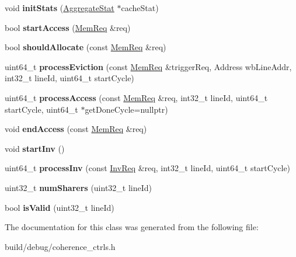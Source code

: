 \begin{DoxyCompactItemize}
\item 
\hypertarget{classMESICC_a7424c192e0d55b477e036da015e47697}{void {\bfseries init\-Stats} (\hyperlink{classAggregateStat}{Aggregate\-Stat} $\ast$cache\-Stat)}\label{classMESICC_a7424c192e0d55b477e036da015e47697}

\item 
\hypertarget{classMESICC_adb266df86e3a6455a7384bc8d3958dfc}{bool {\bfseries start\-Access} (\hyperlink{structMemReq}{Mem\-Req} \&req)}\label{classMESICC_adb266df86e3a6455a7384bc8d3958dfc}

\item 
\hypertarget{classMESICC_adff3fdd77b8eb96e12c854ce3c5496ae}{bool {\bfseries should\-Allocate} (const \hyperlink{structMemReq}{Mem\-Req} \&req)}\label{classMESICC_adff3fdd77b8eb96e12c854ce3c5496ae}

\item 
\hypertarget{classMESICC_a0489e87c75a299d40c1b06b3660b015f}{uint64\-\_\-t {\bfseries process\-Eviction} (const \hyperlink{structMemReq}{Mem\-Req} \&trigger\-Req, Address wb\-Line\-Addr, int32\-\_\-t line\-Id, uint64\-\_\-t start\-Cycle)}\label{classMESICC_a0489e87c75a299d40c1b06b3660b015f}

\item 
\hypertarget{classMESICC_aa8e01a308fd975cb06ed958fe79b5f5c}{uint64\-\_\-t {\bfseries process\-Access} (const \hyperlink{structMemReq}{Mem\-Req} \&req, int32\-\_\-t line\-Id, uint64\-\_\-t start\-Cycle, uint64\-\_\-t $\ast$get\-Done\-Cycle=nullptr)}\label{classMESICC_aa8e01a308fd975cb06ed958fe79b5f5c}

\item 
\hypertarget{classMESICC_a191b816ae3926a67e832e154682d1556}{void {\bfseries end\-Access} (const \hyperlink{structMemReq}{Mem\-Req} \&req)}\label{classMESICC_a191b816ae3926a67e832e154682d1556}

\item 
\hypertarget{classMESICC_a75c6b7abe753289c3c3e4b63a240bfe0}{void {\bfseries start\-Inv} ()}\label{classMESICC_a75c6b7abe753289c3c3e4b63a240bfe0}

\item 
\hypertarget{classMESICC_adcf52b6d718a2dde14c7c65dcc9556b0}{uint64\-\_\-t {\bfseries process\-Inv} (const \hyperlink{structInvReq}{Inv\-Req} \&req, int32\-\_\-t line\-Id, uint64\-\_\-t start\-Cycle)}\label{classMESICC_adcf52b6d718a2dde14c7c65dcc9556b0}

\item 
\hypertarget{classMESICC_afe175acbb1827ab513a14b42bc9c6672}{uint32\-\_\-t {\bfseries num\-Sharers} (uint32\-\_\-t line\-Id)}\label{classMESICC_afe175acbb1827ab513a14b42bc9c6672}

\item 
\hypertarget{classMESICC_a71f60cbea5b1703241317aca971dccca}{bool {\bfseries is\-Valid} (uint32\-\_\-t line\-Id)}\label{classMESICC_a71f60cbea5b1703241317aca971dccca}

\end{DoxyCompactItemize}


The documentation for this class was generated from the following file\-:\begin{DoxyCompactItemize}
\item 
build/debug/coherence\-\_\-ctrls.\-h\end{DoxyCompactItemize}
